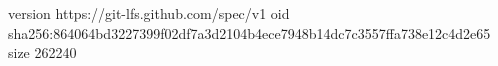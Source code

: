 version https://git-lfs.github.com/spec/v1
oid sha256:864064bd3227399f02df7a3d2104b4ece7948b14dc7c3557ffa738e12c4d2e65
size 262240
